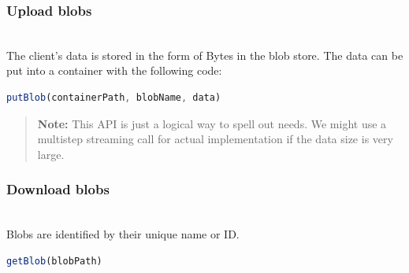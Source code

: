 \subsubsection{Upload blobs}\label{7KHuCVFgOV06cbEkqz4vk}
\\
The client's data is stored in the form of Bytes in the blob store. The data can be put into a container with the following code:

\begin{lstlisting}[language=JavaScript]
putBlob(containerPath, blobName, data)
\end{lstlisting}

\begin{table}[htbp]
\centering
\small
{}
\end{table}

\begin{quote}
\textbf{Note:} This API is just a logical way to spell out needs. We might use a multistep streaming call for actual implementation if the data size is very large.
\end{quote}
\subsubsection{Download blobs}\label{0zK4cjqRJXuF9HMvL2Ch4}
\\
Blobs are identified by their unique name or ID.

\begin{lstlisting}[language=JavaScript]
getBlob(blobPath)
\end{lstlisting}

\begin{table}[htbp]
\centering
\small
{}
\end{table}

